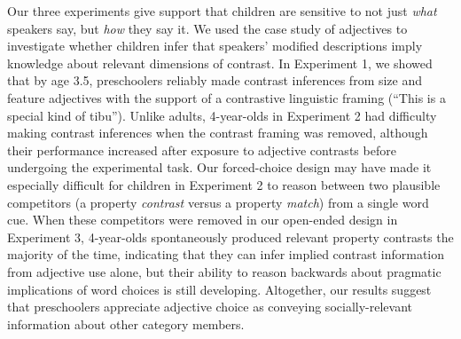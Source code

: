 \documentclass[man]{apa2}
\begin{document}
Our three experiments give support that children are sensitive to not just \emph{what} speakers say, but \emph{how} they say it.  We used the case study of adjectives to investigate whether children infer that speakers' modified descriptions imply knowledge about relevant dimensions of contrast. In Experiment 1, we showed that by age 3.5, preschoolers reliably made contrast inferences from size and feature adjectives with the support of a contrastive linguistic framing (``This is a special kind of tibu'').  Unlike adults, 4-year-olds in Experiment 2 had difficulty making contrast inferences when the contrast framing was removed, although their performance increased after exposure to adjective contrasts before undergoing the experimental task. Our forced-choice design may have made it especially difficult for children in Experiment 2 to reason between two plausible competitors (a property \emph{contrast} versus a property \emph{match}) from a single word cue. When these competitors were removed in our open-ended design in Experiment 3, 4-year-olds spontaneously produced relevant property contrasts the majority of the time, indicating that they can infer implied contrast information from adjective use alone, but their ability to reason backwards about pragmatic implications of word choices is still developing. Altogether, our results suggest that preschoolers appreciate adjective choice as conveying socially-relevant information about other category members. 

%
%
%
%
%
%
\end{document}
